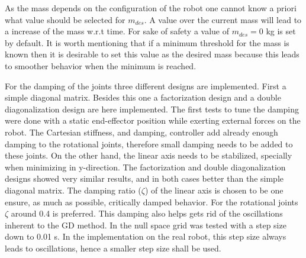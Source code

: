 As the mass depends on the  configuration of the robot one cannot know a priori what value should be selected for $m_{des}$. A value over the current mass will lead to a increase of the mass w.r.t time. 
For sake of safety a value of $m_{des}=0$ kg is set by default. It is worth mentioning that if a minimum threshold for the mass is known then it is desirable to set this value as the desired mass because this leads to smoother behavior when the minimum is reached.




For the damping of the joints three different designs are implemented. First a simple diagonal matrix. Besides this one a factorization design and a double diagonalization design \cite{alin_damping} are here implemented. The first tests to tune the damping were  done with a static end-effector position while exerting external forces on the robot. The Cartesian stiffness, and damping, controller add already enough damping to the rotational joints, therefore small damping needs to be added to these joints. On the other hand, the linear axis needs to be stabilized, specially when minimizing in y-direction. The factorization and double diagonalization designs showed very similar results, and in both cases better than the simple diagonal matrix. The  damping ratio ($\zeta$) of the linear axis is chosen to be one ensure, as much as possible, critically damped behavior. For the rotational joints $\zeta$ around 0.4 is preferred.
This damping also helps gets rid of the oscillations inherent to the GD method.
In \cite{fabianthesis} the null space grid was tested with a step size down to 0.01 s. In the  implementation on the real robot,  this step size  always leads to oscillations, hence  a smaller step size shall be used.




